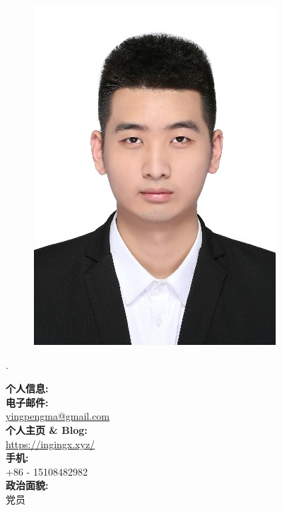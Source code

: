\documentclass[a4paper,11pt,final]{memoir}
\newcommand{\myThemeColor}{RoyalBlue}
\newcommand{\CVItem}[1]
	{\textbf{\color{\myThemeColor} #1}}
\begin{document}
\begin{CJK*}{UTF8}{gbsn}%
\begin{figure}
	\hfill
	\includegraphics[width=0.9\columnwidth]{avatar1}
	\vspace{-7cm}
\end{figure}
\begin{flushright}\footnotesize
.\\
\vskip 6cm
    \raggedright
	\CVItem{{\large 个人信息:}}\\
	\textbf{电子邮件:}\\
	\href{mailto:yingpengma@gmail.com}{yingpengma@gmail.com}  \\
	\textbf{个人主页 \& Blog:}\\
	\href{https://ingingx.xyz/}{https://ingingx.xyz/}\\
	\textbf{手机:}\\
	+86 - 15108482982\\
	\textbf{政治面貌:}\\
	党员


\end{flushright}
\end{CJK*}
\end{document}
